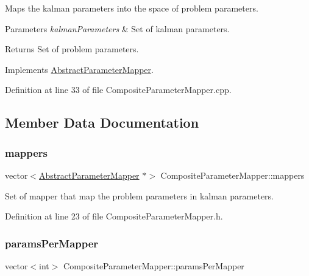 Maps the kalman parameters into the space of problem parameters. 
\begin{DoxyParams}{Parameters}
{\em kalman\+Parameters} & Set of kalman parameters. \\
\hline
\end{DoxyParams}
\begin{DoxyReturn}{Returns}
Set of problem parameters. 
\end{DoxyReturn}


Implements \mbox{\hyperlink{classAbstractParameterMapper_a7fc9715759582e218a3bc38ec43e2d57}{Abstract\+Parameter\+Mapper}}.



Definition at line 33 of file Composite\+Parameter\+Mapper.\+cpp.



\subsection{Member Data Documentation}
\mbox{\label{classCompositeParameterMapper_a3f0668fba0502d95363d935ddf9fe9b4}} 
\subsubsection{\texorpdfstring{mappers}{mappers}}
{\footnotesize\ttfamily vector$<$\mbox{\hyperlink{classAbstractParameterMapper}{Abstract\+Parameter\+Mapper}} $\ast$$>$ Composite\+Parameter\+Mapper\+::mappers\hspace{0.3cm}{\ttfamily [private]}}

Set of mapper that map the problem parameters in kalman parameters. 

Definition at line 23 of file Composite\+Parameter\+Mapper.\+h.

\mbox{\label{classCompositeParameterMapper_ac39d00895ac754c09a81619aba5f644b}} 
\subsubsection{\texorpdfstring{params\+Per\+Mapper}{paramsPerMapper}}
{\footnotesize\ttfamily vector$<$int$>$ Composite\+Parameter\+Mapper\+::params\+Per\+Mapper\hspace{0.3cm}{\ttfamily [private]}}

